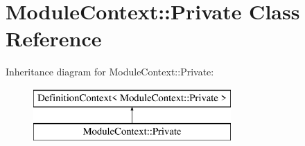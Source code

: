 \hypertarget{class_module_context_1_1_private}{}\section{Module\+Context\+::Private Class Reference}
\label{class_module_context_1_1_private}
Inheritance diagram for Module\+Context\+::Private\+:\begin{figure}[H]
\begin{center}
\leavevmode
\includegraphics[height=2.000000cm]{class_module_context_1_1_private}
\end{center}
\end{figure}
